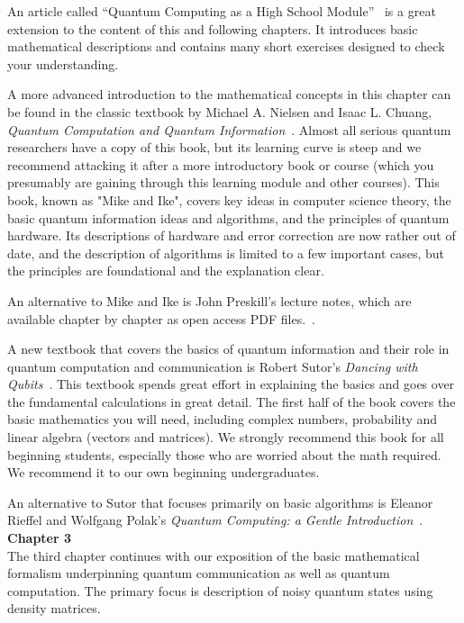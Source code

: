 An article called ``Quantum Computing as a High School Module''~\cite{perry2019quantum} is a great extension to the content of this and following chapters. It introduces basic mathematical descriptions and contains many short exercises designed to check your understanding.

A more advanced introduction to the mathematical concepts in this chapter can be found in the classic textbook by Michael A. Nielsen and Isaac L. Chuang, \emph{Quantum Computation and Quantum Information}~\cite{nielsen-chuang:qci}. Almost all serious quantum researchers have a copy of this book, but its learning curve is steep and we recommend attacking it after a more introductory book or course (which you presumably are gaining through this learning module and other courses). This book, known as "Mike and Ike", covers key ideas in computer science theory, the basic quantum information ideas and algorithms, and the principles of quantum hardware. Its descriptions of hardware and error correction are now rather out of date, and the description of algorithms is limited to a few important cases, but the principles are foundational and the explanation clear.

An alternative to Mike and Ike is John Preskill's lecture notes, which are available chapter by chapter as open access PDF files.~\cite{preskill1998lecture}.

A new textbook that covers the basics of quantum information and their role in quantum computation and communication is Robert Sutor's \emph{Dancing with Qubits}~\cite{sutor19:dancing}. This textbook spends great effort in explaining the basics and goes over the fundamental calculations in great detail. The first half of the book covers the basic mathematics you will need, including complex numbers, probability and linear algebra (vectors and matrices). We strongly recommend this book for all beginning students, especially those who are worried about the math required. We recommend it to our own beginning undergraduates.

An alternative to Sutor that focuses primarily on basic algorithms is Eleanor Rieffel and Wolfgang Polak's \emph{Quantum Computing: a Gentle Introduction}~\cite{rieffel2011quantum}.\\

\textbf{Chapter 3}\\

The third chapter continues with our exposition of the basic mathematical formalism underpinning quantum communication as well as quantum computation. The primary focus is description of noisy quantum states using density matrices.

